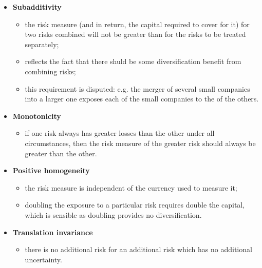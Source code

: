 \documentclass[notoc,notitlepage]{tufte-book}
\begin{document}
\begin{itemize}
  \item \textbf{Subadditivity}
    \begin{itemize}
      \item the risk measure (and in return, the capital required to cover for it) for two risks combined will not be greater than for the risks to be treated separately;
      \item reflects the fact that there shuld be some diversification benefit from combining risks;
      \item this requirement is disputed: e.g. the merger of several small companies into a larger one exposes each of the small companies to the  of the others.
    \end{itemize}

  \item \textbf{Monotonicity}
    \begin{itemize}
      \item if one risk always has greater losses than the other under all circumstances, then the risk measure of the greater risk should always be greater than the other.
    \end{itemize}

  \item \textbf{Positive homogeneity}
    \begin{itemize}
      \item the risk measure is independent of the currency used to measure it;
      \item doubling the exposure to a particular risk requires double the capital, which is sensible as doubling provides no diversification.
    \end{itemize}

  \item \textbf{Translation invariance}
    \begin{itemize}
      \item there is no additional risk for an additional risk which has no additional uncertainty.
    \end{itemize}
\end{itemize}



\backmatter

\pagestyle{plain}

\nobibliography*




\printindex
\end{document}
